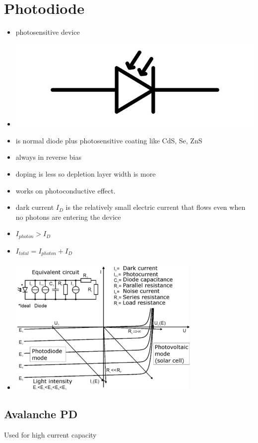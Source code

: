 \documentclass[10pt, a4paper]{report}
\begin{document}
	\section{Photodiode}
	\begin{itemize}
		\item photosensitive device
		\item \includegraphics[width=0.2\linewidth]{img/photodiode symbol}
		\item is normal diode plus photosensitive coating like CdS, Se, ZnS
		\item always in reverse bias
		\item doping is less so depletion layer width is more
		\item works on photoconductive effect.
		\item dark current $ I_D $ is the relatively small electric current that flows even when no photons are entering the device
		\item $ I_{photon} > I_D $
		\item $ I_{total} =  I_{photon} + I_D $
		\item \includegraphics[width=\linewidth]{img/photodiode graph}
	\end{itemize}
	\subsection{Avalanche PD}
	Used for high current capacity
\end{document}

